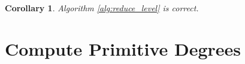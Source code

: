 \documentclass[11pt,reqno]{amsart}
\theoremstyle{plain}
\newtheorem{corollary}[theorem]{Corollary}
\theoremstyle{definition}
\newcommand{\Z}{\bZ}
\newcommand{\abbey}[1]{\textcolor{blue}{Abbey: #1}}
\newcommand{\sachi}[1]{\textcolor{purple}{Sachi: #1}}
\newcommand{\travis}[1]{\textcolor{orange}{Travis: #1}}
\begin{document}
  \begin{corollary}
  Algorithm \ref{alg:reduce_level} is correct.
  \end{corollary}
  




\section{Compute Primitive Degrees}
\label{sec:primitivedeg}
\end{document}

